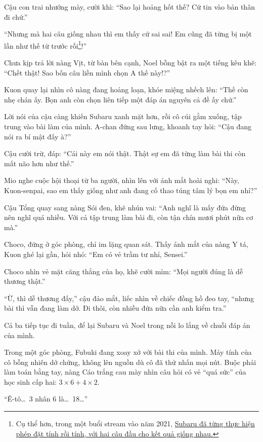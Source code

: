 \documentclass[../main.tex]{subfiles}
\begin{document}
Cậu con trai nhướng mày, cười khì: ``Sao lại hoảng hốt thế? Cứ tin vào bản thân đi chứ.''

``Nhưng mà hai câu giống nhau thì em thấy cứ sai sai! Em cũng đã từng bị một lần như thế từ trước rồi\footnote{Cụ thể hơn, trong một buổi stream vào năm 2021, \href{https://www.youtube.com/watch?v=4gsPSOFntgk}{Subaru đã từng thực hiện phép đặt tính rồi tính, với hai câu đầu cho kết quả giống nhau.}}!''

Chưa kịp trả lời nàng Vịt, từ bàn bên cạnh, Noel bỗng bật ra một tiếng kêu khẽ: ``Chết thật! Sao bốn câu liền mình chọn A thế này!?''

Kuon quay lại nhìn cô nàng đang hoảng loạn, khóe miệng nhếch lên: ``Thế còn nhẹ chán ấy. Bọn anh còn chọn liên tiếp một đáp án nguyên cả đề ấy chứ.''

Lời nói của cậu càng khiến Subaru xanh mặt hơn, rồi cô cúi gằm xuống, tập trung vào bài làm của mình. A-chan đứng sau lưng, khoanh tay hỏi: ``Cậu đang nói ra bí mật đấy à?''

Cậu cười trừ, đáp: ``Cái này em nói thật. Thật sự em đã từng làm bài thi còn mất não hơn như thế.''

Mio nghe cuộc hội thoại từ ba người, nhìn lên với ánh mắt hoài nghi: ``Này, Kuon-senpai, sao em thấy giống như anh đang cố thao túng tâm lý bọn em nhỉ?''

Cậu Tổng quay sang nàng Sói đen, khẽ nhún vai: ``Anh nghĩ là mấy đứa đừng nên nghĩ quá nhiều. Với cả tập trung làm bài đi, còn tận chín mươi phút nữa cơ mà.''

Choco, đứng ở góc phòng, chỉ im lặng quan sát. Thấy ánh mắt của nàng Y tá, Kuon ghé lại gần, hỏi nhỏ: ``Em có vẻ trầm tư nhỉ, Sensei.''

Choco nhìn vẻ mặt căng thẳng của họ, khẽ cười mỉm: ``Mọi người đúng là dễ thương thật.''

``Ừ, thì dễ thương đấy,'' cậu đảo mắt, liếc nhìn về chiếc đồng hồ đeo tay, ``nhưng bài thì vẫn đang làm dở. Đi thôi, còn nhiều đứa nữa cần anh kiểm tra.''

Cả ba tiếp tục đi tuần, để lại Subaru và Noel trong nỗi lo lắng về chuỗi đáp án của mình.

\ct

Trong một góc phòng, Fubuki đang xoay xở với bài thi của mình. Máy tính của cô bỗng nhiên dở chứng, không lên nguồn dù cô đã thử nhấn mọi nút. Buộc phải làm toán bằng tay, nàng Cáo trắng cau mày nhìn câu hỏi có vẻ ``quá sức'' của học sinh cấp hai: \(3 \times 6 + 4 \times 2\).

``Ê-tô\dots\ 3 nhân 6 là\dots\ 18\dots''
\end{document}
